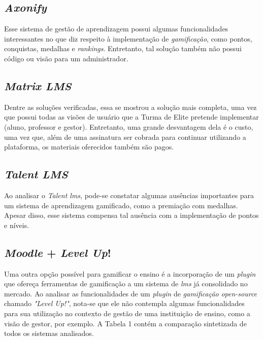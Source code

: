 \subsection{\textit{Axonify}}
Esse sistema de gestão de aprendizagem possui algumas funcionalidades interessantes no que diz respeito à implementação de \textit{gamificação}, como pontos, conquistas, medalhas e \textit{\glspl{ranking}}. Entretanto, tal solução também não possui código ou visão para um administrador. 

\subsection{\textit{Matrix LMS}}
Dentre as soluções verificadas, essa se mostrou a solução mais completa, uma vez que possui todas as visões de usuário que a Turma de Elite pretende implementar (aluno, professor e gestor). Entretanto, uma grande desvantagem dela é o custo, uma vez que, além de uma assinatura ser cobrada para continuar utilizando a plataforma, os materiais oferecidos também são pagos.  

\subsection{\textit{Talent LMS}}
Ao analisar o \textit{Talent \ac{lms}}, pode-se constatar algumas ausências importantes para um sistema de aprendizagem gamificado, como a premiação com medalhas. Apesar disso, esse sistema compensa tal ausência com a implementação de pontos e níveis.


\subsection{\textit{Moodle} + \textit{Level Up}!}
Uma outra opção possível para gamificar o ensino é a incorporação de um \textit{\gls{plugin}} que ofereça ferramentas de gamificação a um sistema de \textit{\ac{lms}} já consolidado no mercado. Ao analisar as funcionalidades de um \textit{\gls{plugin}} de \textit{gamificação} \textit{\gls{open-source}} chamado \textit{"Level Up!"}, nota-se que ele não contempla algumas funcionalidades para sua utilização no contexto de gestão de uma instituição de ensino, como a visão de gestor, por exemplo.
A Tabela 1 contém a comparação sintetizada de todos os sistemas analisados.

